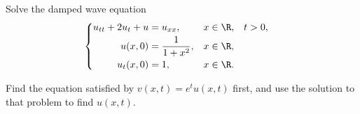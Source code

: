 \documentclass[plain]{pset}
\begin{document}
\pagebreak

\begin{problem}
Solve the damped wave equation
\[
    \begin{cases}
        \begin{aligned}
            u_{tt} + 2u_t + u & = u_{xx},            & x \in \R, &  & t > 0, \\
            u(x, 0)           & = \frac{1}{1 + x^2}, & x \in \R,             \\
            u_t(x, 0)         & = 1,                 & x \in \R.
        \end{aligned}
    \end{cases}
\]
\begin{hint}
    Find the equation satisfied by \(v(x, t) = e^t u(x, t)\) first, and use the solution to that problem to find \(u(x, t)\).
\end{hint}
\end{problem}
\end{document}
